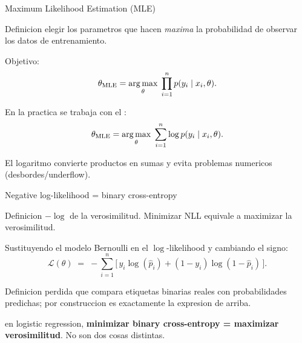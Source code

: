 \begin{frame}{Maximum Likelihood Estimation (MLE)}
\begin{block}{Definicion}
\small
{} elegir los parametros que hacen \emph{maxima} la probabilidad de observar los datos de entrenamiento.
\end{block}

\vspace{0.25em}
Objetivo:
\[
\theta_{\mathrm{MLE}}
= \argmax_\theta \;\prod_{i=1}^{n} p(y_i\mid x_i, \theta).
\]

\vspace{0.25em}
En la practica se trabaja con el :
\[
\theta_{\mathrm{MLE}}
= \argmax_\theta \;\sum_{i=1}^{n} \log p(y_i \mid x_i, \theta).
\]

\vspace{0.2em}
{\footnotesize El logaritmo convierte productos en sumas y evita problemas numericos (desbordes/underflow).}
\end{frame}

\begin{frame}{Negative log-likelihood = binary cross-entropy}
\begin{block}{Definicion}
\small
{} $-\log$ de la verosimilitud. Minimizar NLL equivale a maximizar la verosimilitud.
\end{block}

\vspace{0.2em}
Sustituyendo el modelo Bernoulli en el $\log$-likelihood y cambiando el signo:
\[
\mathcal{L}(\theta) \;=\;
-\sum_{i=1}^{n}\Big[\,y_i\log(\hat p_i) + (1-y_i)\log(1-\hat p_i)\,\Big].
\]

\vspace{0.25em}
\begin{block}{Definicion}
\small
{} perdida que compara etiquetas binarias reales con probabilidades predichas; por construccion es exactamente la expresion de arriba.
\end{block}

\vspace{0.25em}
 en logistic regression, \textbf{minimizar binary cross-entropy = maximizar verosimilitud}. No son dos cosas distintas.
\end{frame}

